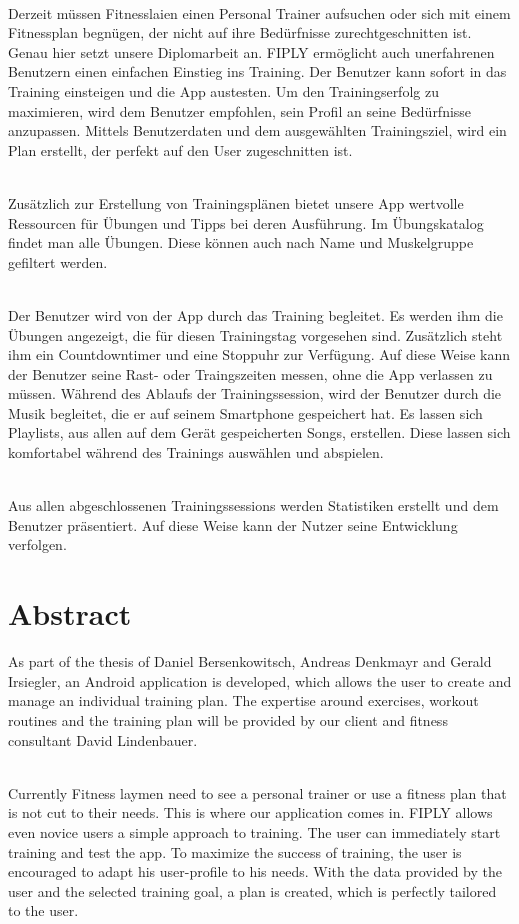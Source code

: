 \documentclass[FIPLY_base.tex]{subfiles}
\begin{document}
\ \\
Derzeit müssen Fitnesslaien einen Personal Trainer aufsuchen oder sich mit einem Fitnessplan begnügen, der nicht auf ihre Bedürfnisse zurechtgeschnitten ist. Genau hier setzt unsere Diplomarbeit an. FIPLY ermöglicht auch unerfahrenen Benutzern einen einfachen Einstieg ins Training. Der Benutzer kann sofort in das Training einsteigen und die App austesten.
Um den Trainingserfolg zu maximieren, wird dem Benutzer empfohlen, sein Profil an seine Bedürfnisse anzupassen.
Mittels Benutzerdaten und dem ausgewählten Trainingsziel, wird ein Plan erstellt, der perfekt auf den User zugeschnitten ist.

\ \\
Zusätzlich zur Erstellung von Trainingsplänen bietet unsere App wertvolle Ressourcen für Übungen und Tipps bei deren Ausführung. Im Übungskatalog findet man alle Übungen. Diese können auch nach Name und Muskelgruppe gefiltert werden.

\ \\
Der Benutzer wird von der App durch das Training begleitet. Es werden ihm die Übungen angezeigt, die für diesen Trainingstag vorgesehen sind. Zusätzlich steht ihm ein Countdowntimer und eine Stoppuhr zur Verfügung. Auf diese Weise kann der Benutzer seine Rast- oder Traingszeiten messen, ohne die App verlassen zu müssen.  
Während des Ablaufs der Trainingssession, wird der Benutzer durch die Musik begleitet, die er auf seinem Smartphone gespeichert hat.
Es lassen sich Playlists, aus allen auf dem Gerät gespeicherten Songs, erstellen. Diese lassen sich komfortabel während des Trainings auswählen und abspielen.

\ \\
Aus allen abgeschlossenen Trainingssessions werden Statistiken erstellt und dem Benutzer präsentiert.
Auf diese Weise kann der Nutzer seine Entwicklung verfolgen. 



\newpage
\section{Abstract}
As part of the thesis of Daniel Bersenkowitsch, Andreas Denkmayr and Gerald Irsiegler, an Android application is developed, which allows the user to create and manage an individual training plan.
The expertise around exercises, workout routines and the training plan will be provided by our client and fitness consultant David Lindenbauer.

\ \\
Currently Fitness laymen need to see a personal trainer or use a fitness plan that is not cut to their needs. This is where our application comes in. FIPLY allows even novice users a simple approach to training. The user can immediately start training and test the app.
To maximize the success of training, the user is encouraged to adapt his user-profile to his needs.
With the data provided by the user and the selected training goal, a plan is created, which is perfectly tailored to the user.
\end{document}

